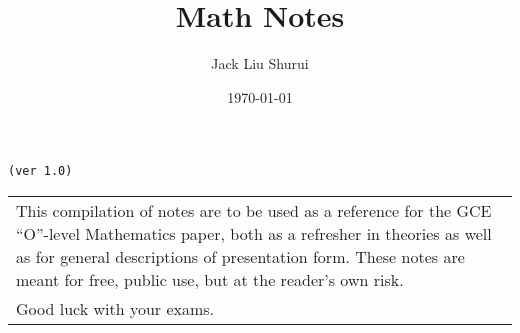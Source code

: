 \documentclass[../main]{subfiles}
\begin{document}
\author{Jack Liu Shurui}
\title{Math Notes}
\date{\today}

\maketitle

\begin{center}

	\texttt{(ver 1.0)}

	\vspace{50pt}

	\begin{tabular}{>{\flushleft}p{8cm}}
	This compilation of notes are to be used as a reference for the GCE ``O''-level Mathematics paper, both as a refresher in theories as well as for general descriptions of presentation form. These notes are meant for free, public use, but at the reader's own risk. \\
	Good luck with your exams.
	\end{tabular}

	\vspace{50pt}

\end{center}

\newpage
\end{document}
